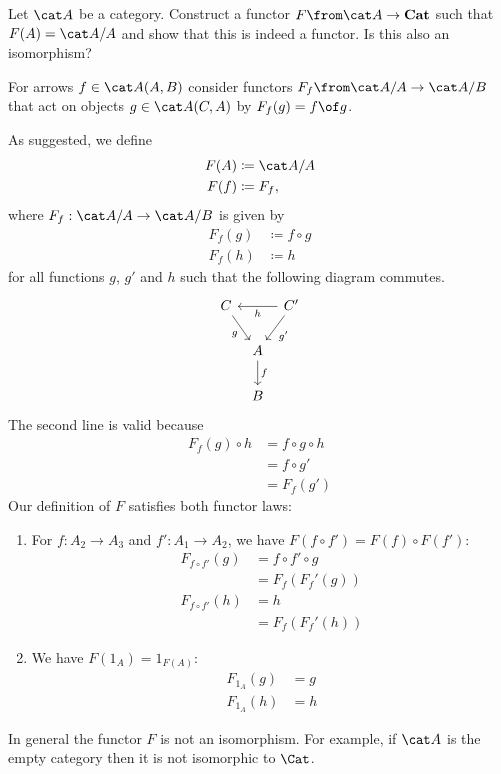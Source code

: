 \begin{exercise}
  Let $\A$ be a category. Construct a functor $F\from \A\to\mathbf{Cat}$ such that $F(A)=\A/A$ and show that this is indeed a functor. Is this also an isomorphism?

  \begin{hint}
    For arrows $f\in\A(A,B)$ consider functors $F_f\from\A/A\to\A/B$ that act on objects $g\in \A(C,A)$ by $F_f(g)=f\of g$.
  \end{hint}
\end{exercise}

\begin{answer}
  As suggested, we define
  \begin{align*}
    F(A) &\coloneqq \A / A \\
    F(f) &\coloneqq F_f,
  \end{align*}
  where $F_f : \A / A \to \A / B$ is given by
  \begin{align*}
    F_f(g) &\coloneqq f \circ g \\
    F_f(h) &\coloneqq h
  \end{align*}
  for all functions $g$, $g'$ and $h$ such that the following diagram commutes.
  \[ \begin{tikzcd}[column sep=tiny]
    C \arrow[dr, "g"'] && C' \arrow[ll, "h"] \arrow[dl, "g'"] \\
    & A \arrow[d, "f"] \\
    & B
  \end{tikzcd} \]
  The second line is valid because
  \[ \begin{split}
    F_f(g) \circ h
    &= f \circ g \circ h \\
    &= f \circ g' \\
    &= F_f(g')
  \end{split} \]
  Our definition of $F$ satisfies both functor laws:
  \begin{enumerate}
    \item For $f : A_2 \to A_3$ and $f' : A_1 \to A_2$, we have $F(f \circ f') = F(f) \circ F(f')$:
      \begin{align*}
        F_{f \circ f'}(g)
          &= f \circ f' \circ g \\
          &= F_f(F_f'(g)) \\
        F_{f \circ f'}(h)
          &= h \\
          &= F_f(F_f'(h))
      \end{align*}
    \item We have $F(1_A) = 1_{F(A)}$:
      \begin{align*}
        F_{1_A}(g) &= g \\
        F_{1_A}(h) &= h
      \end{align*}
  \end{enumerate}
  In general the functor $F$ is not an isomorphism.
  For example, if $\A$ is the empty category then it is not isomorphic to $\Cat$.
\end{answer}






